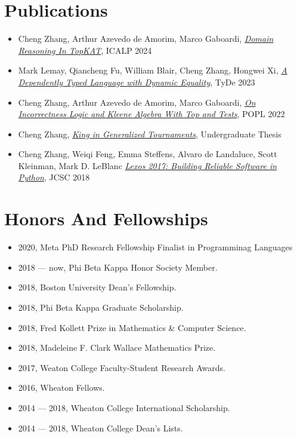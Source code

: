 \section*{Publications}

\begin{itemize}
    \item 
    Cheng Zhang, Arthur Azevedo de Amorim, Marco Gaboardi,
    \emph{\href{https://arxiv.org/abs/2404.18417}{Domain Reasoning In TopKAT}}, ICALP 2024
    
    \item 
    Mark Lemay, Qiancheng Fu, William Blair, Cheng Zhang, Hongwei Xi,
    \emph{\href{https://doi.org/10.1145/3609027.3609407}{A Dependently Typed Language with Dynamic Equality}}, TyDe 2023

    \item 
    Cheng Zhang, Arthur Azevedo de Amorim, Marco Gaboardi,
    \emph{\href{https://arxiv.org/abs/2108.07707}{On Incorrectness Logic and Kleene Algebra With Top and Tests}}, POPL 2022

    \item 
    Cheng Zhang, \emph{\href{http://hdl.handle.net/11040/24570}{King in Generalized Tournaments}}, Undergraduate Thesis 

    \item 
    Cheng Zhang, Weiqi Feng, Emma Steffens, Alvaro de Landaluce, Scott Kleinman, Mark D. LeBlanc
    \emph{\href{https://dl.acm.org/doi/10.5555/3205191.3205205}{Lexos 2017: Building Reliable Software in Python}}, JCSC 2018
\end{itemize}


\section*{Honors And Fellowships}

\begin{itemize}
    \item 2020, Meta PhD Research Fellowship Finalist in Programminag Languages
    \item 2018 --- now, Phi Beta Kappa Honor Society Member.
    \item 2018, Boston University Dean's Fellowship.
    \item 2018, Phi Beta Kappa Graduate Scholarship.
    \item 2018, Fred Kollett Prize in Mathematics \& Computer Science.
    \item 2018, Madeleine F. Clark Wallace Mathematics Prize.
    \item 2017, Weaton College Faculty-Student Research Awards.
    \item 2016, Wheaton Fellows.
    \item 2014 --- 2018, Wheaton College International Scholarship.
    \item 2014 --- 2018, Wheaton College Dean's Lists.
\end{itemize}


